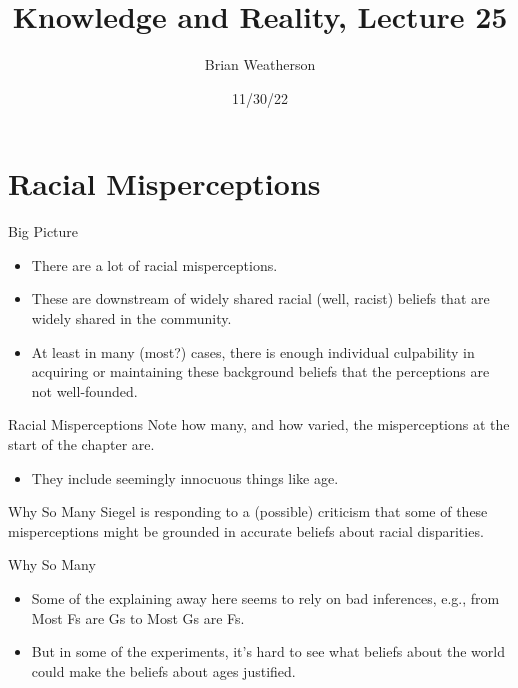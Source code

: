 \documentclass[
  17pt,
  letterpaper,
  ignorenonframetext,
  aspectratio=169,
  xcolor={dvipsnames}]{beamer}
\title{Knowledge and Reality, Lecture 25}
\author{Brian Weatherson}
\date{11/30/22}
\providecommand{\tightlist}{%
  \setlength{\itemsep}{0pt}\setlength{\parskip}{0pt}}\usepackage{longtable,booktabs,array}
\begin{document}
\frame{\titlepage}
\ifdefined\Shaded\renewenvironment{Shaded}{\begin{tcolorbox}[enhanced, frame hidden, breakable, borderline west={3pt}{0pt}{shadecolor}, sharp corners, interior hidden, boxrule=0pt]}{\end{tcolorbox}}\fi

\hypertarget{racial-misperceptions}{%
\section{Racial Misperceptions}\label{racial-misperceptions}}

\begin{frame}{Big Picture}
\protect\hypertarget{big-picture}{}
\begin{itemize}[<+->]
\tightlist
\item
  There are a lot of racial misperceptions.
\item
  These are downstream of widely shared racial (well, racist) beliefs
  that are widely shared in the community.
\item
  At least in many (most?) cases, there is enough individual culpability
  in acquiring or maintaining these background beliefs that the
  perceptions are not well-founded.
\end{itemize}
\end{frame}

\begin{frame}{Racial Misperceptions}
\protect\hypertarget{racial-misperceptions-1}{}
Note how many, and how varied, the misperceptions at the start of the
chapter are.

\begin{itemize}[<+->]
\tightlist
\item
  They include seemingly innocuous things like age.
\end{itemize}
\end{frame}

\begin{frame}{Why So Many}
\protect\hypertarget{why-so-many}{}
Siegel is responding to a (possible) criticism that some of these
misperceptions might be grounded in accurate beliefs about racial
disparities.
\end{frame}

\begin{frame}{Why So Many}
\protect\hypertarget{why-so-many-1}{}
\begin{itemize}[<+->]
\tightlist
\item
  Some of the explaining away here seems to rely on bad inferences,
  e.g., from Most Fs are Gs to Most Gs are Fs.
\item
  But in some of the experiments, it's hard to see what beliefs about
  the world could make the beliefs about ages justified.
\end{itemize}
\end{frame}
\end{document}
